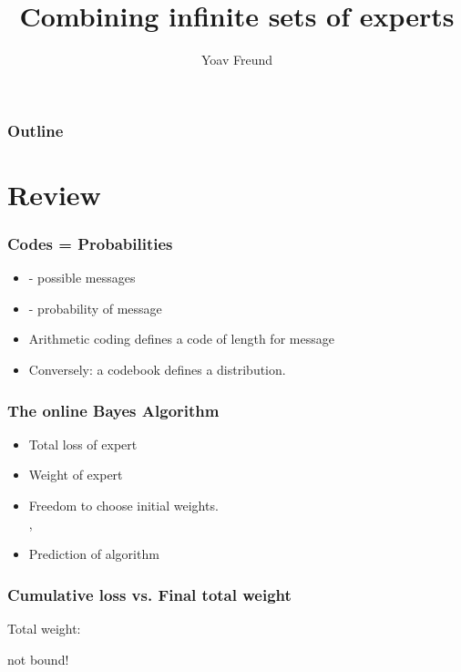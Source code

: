 \documentclass[handout]{beamer}
\title[Infinite sets of experts]%
{Combining infinite sets of experts}
\author[Freund] %
{Yoav Freund}
\institute[Universities of Somewhere and Elsewhere] %
\begin{document}

\begin{frame}
  \titlepage
\end{frame}

\begin{frame}
  \frametitle{Outline}
  \tableofcontents[pausesections]
\end{frame}

\section{Review}

\begin{frame}
  \frametitle{Codes = Probabilities}
  \begin{itemize}
  \item {} - possible messages
  \item {} - probability of message 
  \item Arithmetic coding defines a code of length  for message 
  \item Conversely: a codebook defines a distribution.
    \end{itemize}
\end{frame}

\begin{frame}
\frametitle{The online Bayes Algorithm}
\begin{itemize}
\item {\color{blue} Total loss} of expert 
\item {\color{blue}Weight} of expert 
\item
Freedom to choose initial weights.\\
 , 
\item {\color{blue}Prediction} of algorithm 
\R{\[
\vp_A^t = \frac{\sum_{i=1}^N \wt{t}{i} \vp_i^t}{\sum_{i=1}^N \wt{t}{i}}
\]}
\end{itemize}
\end{frame}

\begin{frame}
\frametitle{Cumulative loss vs. Final total weight}

 Total weight: 

 
 
\R{\[
\onslide<8-> -\log W^{T+1} =
\onslide<6-> -\log \frac{W^{T+1}}{W^1} = -\sum_{t=1}^T \log p_A^t(c^t)
\onslide<7-> = L_A^T
\]}
  not bound!
\end{frame}
\end{document}
